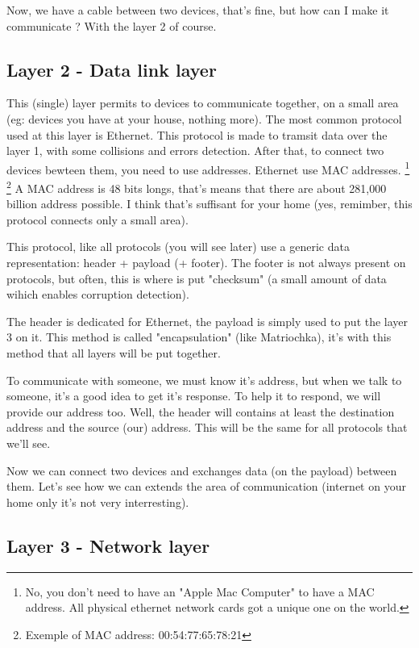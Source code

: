 \documentclass{article}
\begin{document}
	Now, we have a cable between two devices, that's fine, but how can I make it communicate ?
	With the layer 2 of course.

	\subsection{Layer 2 - Data link layer}
	
	This (single) layer permits to devices to communicate together, on a small area (eg: devices you have at your house,
	nothing more). The most common protocol used at this layer is Ethernet. This protocol is made to tramsit data
	over the layer 1, with some collisions and errors detection. After that, to connect two devices bewteen them, you
	need to use addresses. Ethernet use MAC addresses.
	\footnote{No, you don't need to have an "Apple Mac Computer" to have a MAC address.
	All physical ethernet network cards got a unique one on the world.}
	\footnote{Exemple of MAC address: 00:54:77:65:78:21}
	A MAC address is 48 bits longs, that's means that there are about 281,000 billion address possible. I think that's
	suffisant for your home (yes, remimber, this protocol connects only a small area).
	
	This protocol, like all protocols (you will see later) use a generic data representation:
	header + payload (+ footer).
	The footer is not always present on protocols, but often, this is where is put "checksum" (a small amount of data
	wihich enables corruption detection).
	
	The header is dedicated for Ethernet, the payload is simply used to put
	the layer 3 on it. This method is called "encapsulation" (like Matriochka), it's with this method that all layers
	will be put together.
	
	To communicate with someone, we must know it's address, but when we talk to someone, it's a good idea to
	get it's response. To help it to respond, we will provide our address too. Well, the header will contains
	at least the destination address and the source (our) address. This will be the same for all protocols
	that we'll see.
	
	Now we can connect two devices and exchanges data (on the payload) between them. Let's see how we can extends
	the area of communication (internet on your home only it's not very interresting).
	
	\subsection{Layer 3 - Network layer}
	
\end{document}
